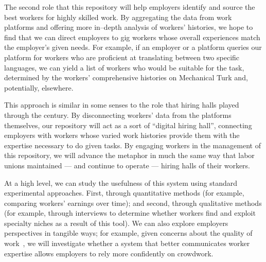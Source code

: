 \documentclass[10pt]{article}
\newcommand{\topic}[1]{{\color{Blue}#1}}
\renewcommand{\topic}[1]{{#1}}
\begin{document}
\topic{The second role that this repository will help employers identify and source the best workers for highly skilled work.}
By aggregating the data from work platforms and
offering more in--depth analysis of workers' histories, we hope to find that
we can direct employers to gig workers whose overall experiences match the employer's given needs.
For example, if an employer or a platform queries our platform for
workers who are proficient at translating between two specific languages,
we can yield a list of workers who would be suitable for the task, determined by
the workers' comprehensive histories on Mechanical Turk and, potentially, elsewhere.

\topic{This approach is similar in some senses to the role that hiring halls played through the \nth{20} century.}
By disconnecting workers' data from the platforms themselves, our repository will act as a sort of ``digital hiring hall'',
connecting employers with workers whose varied work histories provide them with the expertise necessary to do given tasks.
By engaging workers in the management of this repository, we will advance the metaphor in much the same way that
labor unions maintained --- and continue to operate --- hiring halls of their workers.


\topic{At a high level, we can study the usefulness of this system using standard experimental approaches.}
First, through quantitative methods (for example, comparing workers' earnings over time); and
second, through qualitative  methods (for example, through interviews to determine whether workers find and exploit specialty niches as a result of this tool).
We can also explore employers perspectives in tangible ways;
for example, given concerns about the quality of work~\cite{Ipeirotis:2010:QMA:1837885.1837906,le2010ensuring,Law:2017:CTR:2998181.2998197},
we will investigate whether a system that better communicates worker expertise allows employers to rely more confidently on crowdwork.
\end{document}
